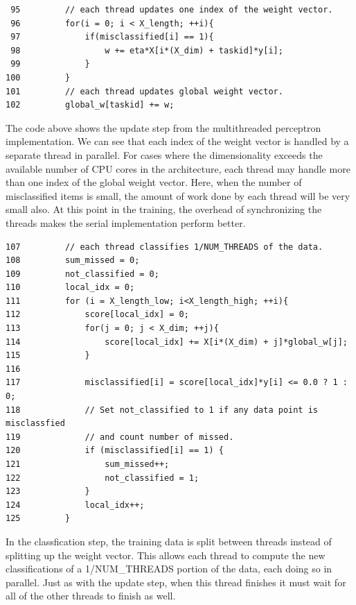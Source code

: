 \documentclass{article}
\begin{document}
\begin{verbatim}
 95         // each thread updates one index of the weight vector.
 96         for(i = 0; i < X_length; ++i){
 97             if(misclassified[i] == 1){
 98                 w += eta*X[i*(X_dim) + taskid]*y[i];
 99             }
100         }
101         // each thread updates global weight vector.
102         global_w[taskid] += w;
\end{verbatim}
The code above shows the update step from the multithreaded perceptron implementation. We can see that each index of the weight vector is handled by a separate thread in parallel. For cases where the dimensionality exceeds the available number of CPU cores in the architecture, each thread may handle more than one index of the global weight vector. Here, when the number of misclassified items is small, the amount of work done by each thread will be very small also. At this point in the training, the overhead of synchronizing the threads makes the serial implementation perform better.

\begin{verbatim}
107         // each thread classifies 1/NUM_THREADS of the data.
108         sum_missed = 0;
109         not_classified = 0;
110         local_idx = 0;
111         for (i = X_length_low; i<X_length_high; ++i){
112             score[local_idx] = 0;
113             for(j = 0; j < X_dim; ++j){
114                 score[local_idx] += X[i*(X_dim) + j]*global_w[j];
115             }
116 
117             misclassified[i] = score[local_idx]*y[i] <= 0.0 ? 1 : 0;
118             // Set not_classified to 1 if any data point is misclassfied
119             // and count number of missed.
120             if (misclassified[i] == 1) {
121                 sum_missed++;
122                 not_classified = 1;
123             }
124             local_idx++;
125         }
\end{verbatim}
In the classfication step, the training data is split between threads instead of splitting up the weight vector. This allows each thread to compute the new classifications of a 1/NUM\_THREADS portion of the data, each doing so in parallel. Just as with the update step, when this thread finishes it must wait for all of the other threads to finish as well.

\clearpage
\end{document}
